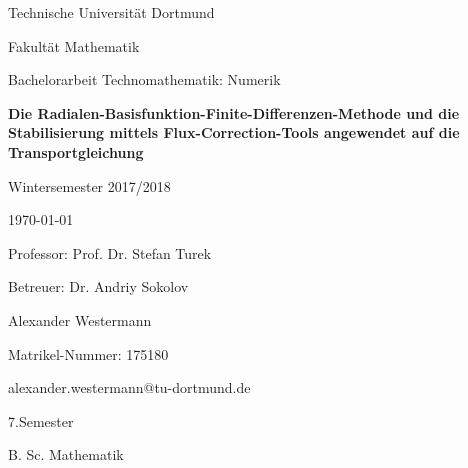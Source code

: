 \documentclass[12pt,titlepage]{article}
\begin{document}
\begin{titlepage}
\pagestyle{empty}
 \centering
 {\LARGE Technische Universität Dortmund \par}
 \vspace{0.5cm}
 {\LARGE Fakultät Mathematik \par}
 \vspace{1cm}
 {\Large Bachelorarbeit Technomathematik: Numerik \par}
 \vspace{2cm}
 {\huge\bfseries Die Radialen-Basisfunktion-Finite-Differenzen-Methode und die Stabilisierung mittels Flux-Correction-Tools angewendet auf die Transportgleichung \par}
 \vspace{2cm}
 {\Large Wintersemester 2017/2018 \par}
 \vspace{0.5cm}
 {\large \today\par}
 \vspace{1cm}
 {\Large Professor: Prof. Dr. Stefan Turek \par}
 \vspace{0.5cm}
 {\Large Betreuer: Dr. Andriy Sokolov \par}
 \vfill
 \begin{flushright}
  {Alexander Westermann \par}
  {Matrikel-Nummer: 175180 \par}
  \vspace{0.5cm}
  {alexander.westermann@tu-dortmund.de \par}
  {7.Semester \par}
  {B. Sc. Mathematik \par}
 \end{flushright}
\end{titlepage}
\pagebreak
{}
 \tableofcontents
\pagebreak
\listoffigures
\pagebreak
{}
\setcounter{page}{1}
\end{document}
